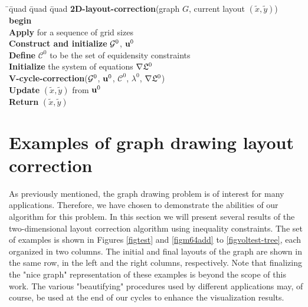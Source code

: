 \documentclass[final]{siamltex}
\newcommand{\keyw}[1]{{\bf #1}}
\begin{document}
\begin{tabbing}
  \quad \=\quad \=quad \=quad \=quad         \kill
  {\bf 2D-layout-correction}(graph $G$, current layout $(\tilde{x},\tilde{y})$)\\
  \keyw{begin}\\
  \> \keyw{Apply} for a sequence of grid sizes\\
  \>\> \keyw{Construct and initialize } $\mathcal{G}^0$, ${\bf u}^0$\\
  \>\> \keyw{Define} $\mathcal{C}^0$ to be the set of equidensity constraints\\
  \>\> \keyw{Initialize} the system of equations $\nabla\mathfrak{L}^0$\\
  \>\> \keyw{V-cycle-correction}($\mathcal{G}^0$, ${\bf u}^0$, $\mathcal{C}^0$, $\lambda^0$, $\nabla\mathfrak{L}^0$)\\
  \>\> \keyw{Update } $(\tilde{x},\tilde{y})$ from ${\bf u}^0$\\
   \keyw{Return} $(\tilde{x},\tilde{y})$\\
\end{tabbing}



\section{Examples of graph drawing layout correction}\label{sExamples}
\par As previously mentioned, the graph drawing problem is of interest
for many applications. Therefore, we have chosen to demonstrate
the abilities of our algorithm for this problem. In this section
we will present several results of the two-dimensional layout
correction algorithm using inequality constraints. The set of
examples is shown in Figures \ref{figtest} and \ref{figm64add} to
 \ref{figvoltest-tree}, each organized in two columns. The initial and
 final layouts of the graph are shown in the same row, in the left and
 the right columns, respectively.
Note that finalizing the "nice graph" representation of these
examples is beyond the scope of this work. The various
"beautifying" procedures used by different applications may, of
course, be used at the end of our cycles to enhance the
visualization results.
\end{document}
